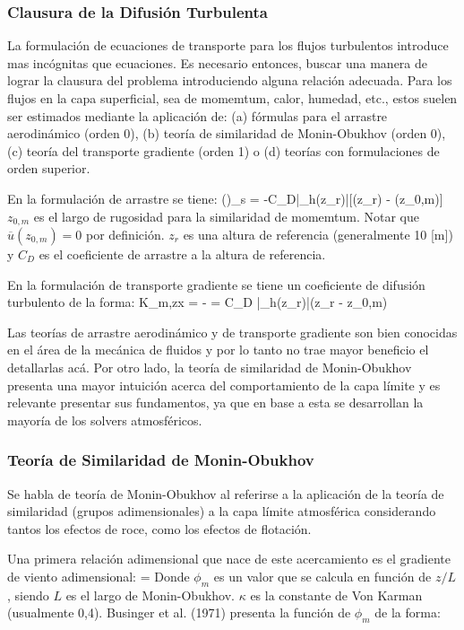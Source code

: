 \subsubsection{Clausura de la Difusión Turbulenta}
La formulación de ecuaciones de transporte para los flujos turbulentos introduce mas incógnitas que ecuaciones. Es necesario entonces, buscar una manera de lograr la clausura del problema introduciendo alguna relación adecuada. Para los flujos en la capa superficial, sea de momemtum, calor, humedad, etc., estos suelen ser estimados mediante la aplicación de: (a) fórmulas para el arrastre aerodinámico (orden 0), (b) teoría de similaridad de Monin-Obukhov (orden 0), (c) teoría del transporte gradiente (orden 1) o (d) teorías con formulaciones de orden superior.

En la formulación de arrastre se tiene:
\be 
()_s = -C_D|_h(z_r)|[(z_r) - (z_{0,m})]
\ee 
$z_{0,m}$ es el largo de rugosidad para la similaridad de momemtum. Notar que $\overline{u}(z_{0,m}) = 0$ por definición. $z_r$ es una altura de referencia (generalmente 10 [m]) y $C_D$ es el coeficiente de arrastre a la altura de referencia.

En la formulación de transporte gradiente se tiene un coeficiente de difusión turbulento de la forma:
\be 
K_{m,zx} = - = C_D |_h(z_r)|(z_r - z_{0,m})
\ee 

Las teorías de arrastre aerodinámico y de transporte gradiente son bien conocidas en el área de la mecánica de fluidos y por lo tanto no trae mayor beneficio el detallarlas acá. Por otro lado, la teoría de similaridad de Monin-Obukhov presenta una mayor intuición acerca del comportamiento de la capa límite y es relevante presentar sus fundamentos, ya que en base a esta se desarrollan la mayoría de los solvers atmosféricos.

\subsubsection{Teoría de Similaridad de Monin-Obukhov}
Se habla de teoría de Monin-Obukhov al referirse a la aplicación de la teoría de similaridad (grupos adimensionales) a la capa límite atmosférica considerando tantos los efectos de roce, como los efectos de flotación.

Una primera relación adimensional que nace de este acercamiento es el gradiente de viento adimensional:
\be \label{eq:03_simi_u}
 = 
\ee
Donde $\phi_m$ es un valor que se calcula en función de $z/L$, siendo $L$ es el largo de Monin-Obukhov. $\kappa$ es la constante de Von Karman (usualmente 0,4). Businger et al. (1971) presenta la función de $\phi_m$ de la forma:

